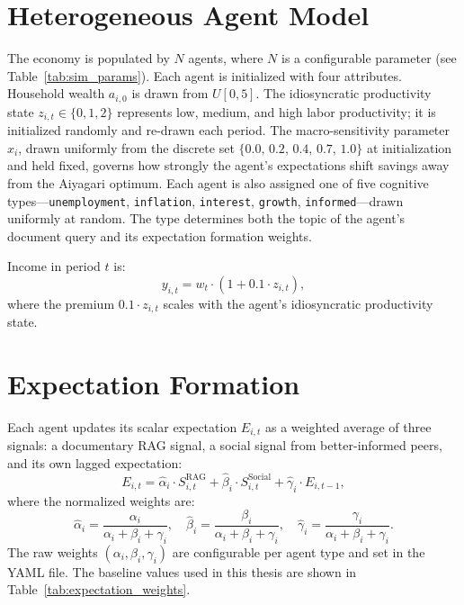 \section{Heterogeneous Agent Model}
\label{sec:agents}

The economy is populated by $N$ agents, where $N$ is a configurable parameter (see Table~\ref{tab:sim_params}). Each agent is initialized with four attributes. Household wealth $a_{i,0}$ is drawn from $U[0, 5]$. The idiosyncratic productivity state $z_{i,t} \in \{0, 1, 2\}$ represents low, medium, and high labor productivity; it is initialized randomly and re-drawn each period. The macro-sensitivity parameter $x_i$, drawn uniformly from the discrete set $\{0.0,\, 0.2,\, 0.4,\, 0.7,\, 1.0\}$ at initialization and held fixed, governs how strongly the agent's expectations shift savings away from the Aiyagari optimum. Each agent is also assigned one of five cognitive types---\texttt{unemployment}, \texttt{inflation}, \texttt{interest}, \texttt{growth}, \texttt{informed}---drawn uniformly at random. The type determines both the topic of the agent's document query and its expectation formation weights.

Income in period $t$ is:
\begin{equation}
    y_{i,t} = w_t \cdot (1 + 0.1 \cdot z_{i,t}),
    \label{eq:income}
\end{equation}
where the premium $0.1 \cdot z_{i,t}$ scales with the agent's idiosyncratic productivity state.


\section{Expectation Formation}
\label{sec:expectations}

Each agent updates its scalar expectation $E_{i,t}$ as a weighted average of three signals: a documentary RAG signal, a social signal from better-informed peers, and its own lagged expectation:
\begin{equation}
    E_{i,t} = \hat{\alpha}_i \cdot S^{\text{RAG}}_{i,t} + \hat{\beta}_i \cdot S^{\text{Social}}_{i,t} + \hat{\gamma}_i \cdot E_{i,t-1},
    \label{eq:expectation_update}
\end{equation}
where the normalized weights are:
\begin{equation}
    \hat{\alpha}_i = \frac{\alpha_i}{\alpha_i + \beta_i + \gamma_i}, \quad
    \hat{\beta}_i = \frac{\beta_i}{\alpha_i + \beta_i + \gamma_i}, \quad
    \hat{\gamma}_i = \frac{\gamma_i}{\alpha_i + \beta_i + \gamma_i}.
    \label{eq:normalized_weights}
\end{equation}
The raw weights $(\alpha_i, \beta_i, \gamma_i)$ are configurable per agent type and set in the YAML file. The baseline values used in this thesis are shown in Table~\ref{tab:expectation_weights}.

